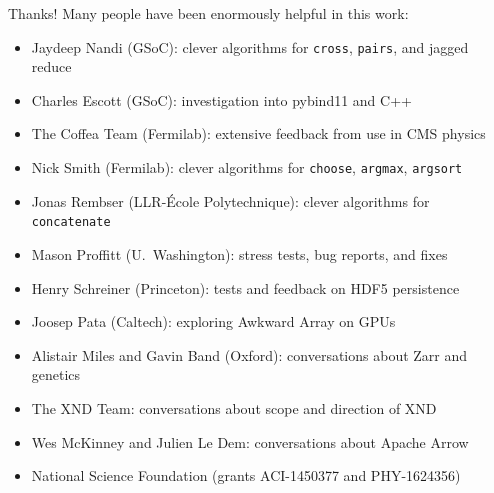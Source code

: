 \documentclass[aspectratio=169]{beamer}
\begin{document}
\begin{frame}{Thanks!}
\vspace{0.35 cm}
Many people have been enormously helpful in this work:
\begin{itemize}
\item Jaydeep Nandi (GSoC): clever algorithms for \texttt{cross}, \texttt{pairs}, and jagged reduce
\item Charles Escott (GSoC): investigation into pybind11 and C++
\item The Coffea Team (Fermilab): extensive feedback from use in CMS physics
\item Nick Smith (Fermilab): clever algorithms for \texttt{choose}, \texttt{argmax}, \texttt{argsort}
\item Jonas Rembser (LLR-\'Ecole Polytechnique): clever algorithms for \texttt{concatenate}
\item Mason Proffitt (U.\ Washington): stress tests, bug reports, and fixes
\item Henry Schreiner (Princeton): tests and feedback on HDF5 persistence
\item Joosep Pata (Caltech): exploring Awkward Array on GPUs
\item Alistair Miles and Gavin Band (Oxford): conversations about Zarr and genetics
\item The XND Team: conversations about scope and direction of XND
\item Wes McKinney and Julien Le Dem: conversations about Apache Arrow
\item National Science Foundation (grants ACI-1450377 and PHY-1624356)
\end{itemize}
\end{frame}
\end{document}
